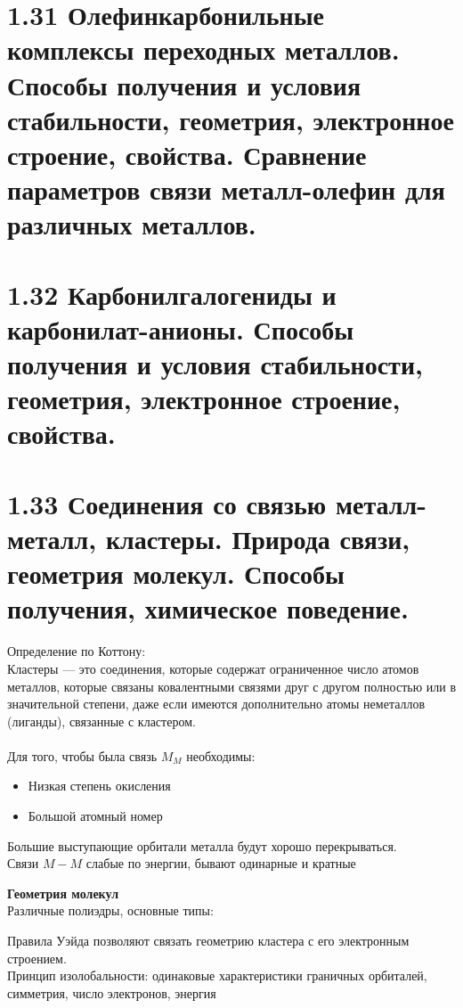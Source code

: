 \section*{1.31 Олефинкарбонильные комплексы переходных металлов. Способы получения и условия стабильности, геометрия, электронное строение, свойства. Сравнение параметров связи металл-олефин для различных металлов.	}

\section*{1.32 Карбонилгалогениды и карбонилат-анионы. Способы получения и условия стабильности, геометрия, электронное строение, свойства.}

\section*{1.33 Соединения со связью металл-металл, кластеры. Природа связи, геометрия молекул. Способы получения, химическое поведение.}
Определение по Коттону: \noindent \\
Кластеры — это соединения, которые содержат ограниченное число атомов металлов, которые связаны ковалентными связями друг с другом полностью или в значительной степени, даже если имеются дополнительно атомы неметаллов (лиганды), связанные с кластером. \\ \\
Для того, чтобы была связь $M_M$ необходимы:
\begin{itemize}
	\item Низкая степень окисления
	\item Большой атомный номер
\end{itemize}
Большие выступающие орбитали металла будут хорошо перекрываться. \\
Связи $M-M$ слабые по энергии, бывают одинарные и кратные\\
\begin{figure} [H]
	\centering {\texttt{[image: ff2]}}
\end{figure}
\textbf{Геометрия молекул}\\
Различные полиэдры, основные типы:
\begin{figure} [H]
	\centering {\texttt{[image: ff1]}}
\end{figure}
Правила Уэйда позволяют связать геометрию кластера с его электронным строением. \\
Принцип изолобальности: одинаковые характеристики граничных орбиталей, симметрия, число электронов, энергия \\
